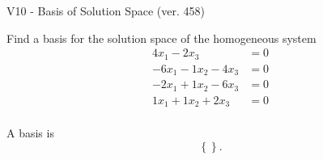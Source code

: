 \begin{exercise}
  \begin{exerciseTitle}V10 - Basis of Solution Space (ver. 458)\end{exerciseTitle}
  \begin{exerciseStatement}
    Find a basis for the solution space of the homogeneous system 
\begin{align*}
 4 x_ 1 -2 x_ 3 &= 0  \\ 
  -6 x_ 1 -1 x_ 2 -4 x_ 3 &= 0  \\ 
  -2 x_ 1 + 1 x_ 2 -6 x_ 3 &= 0  \\ 
  1 x_ 1 + 1 x_ 2 + 2 x_ 3 &= 0  \\ 
 \end{align*}


 
  \end{exerciseStatement}

  \begin{exerciseAnswer}
   A basis is   
\[\left\{\right\}.\]

  


  \end{exerciseAnswer}
\end{exercise}